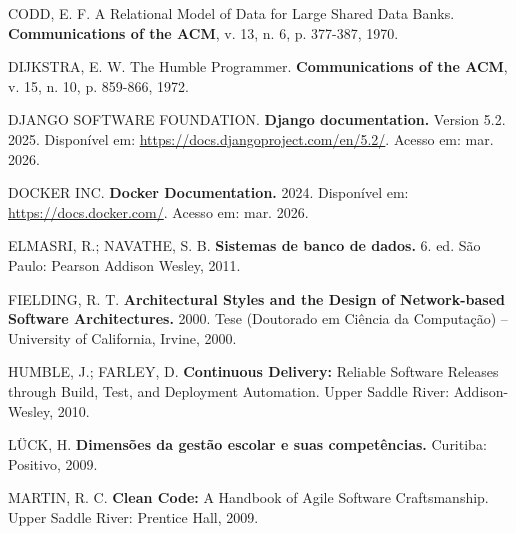 
\begin{singlespace}
\setlength{\parindent}{0pt}
\setlength{\parskip}{0pt}

CODD, E. F. A Relational Model of Data for Large Shared Data Banks. \textbf{Communications of the ACM}, v. 13, n. 6, p. 377-387, 1970.

\vspace{\baselineskip}

DIJKSTRA, E. W. The Humble Programmer. \textbf{Communications of the ACM}, v. 15, n. 10, p. 859-866, 1972.

\vspace{\baselineskip}

DJANGO SOFTWARE FOUNDATION. \textbf{Django documentation.} Version 5.2. 2025. Disponível em: \url{https://docs.djangoproject.com/en/5.2/}. Acesso em: mar. 2026.

\vspace{\baselineskip}

DOCKER INC. \textbf{Docker Documentation.} 2024. Disponível em: \url{https://docs.docker.com/}. Acesso em: mar. 2026.

\vspace{\baselineskip}

ELMASRI, R.; NAVATHE, S. B. \textbf{Sistemas de banco de dados.} 6. ed. São Paulo: Pearson Addison Wesley, 2011.

\vspace{\baselineskip}

FIELDING, R. T. \textbf{Architectural Styles and the Design of Network-based Software Architectures.} 2000. Tese (Doutorado em Ciência da Computação) -- University of California, Irvine, 2000.

\vspace{\baselineskip}

HUMBLE, J.; FARLEY, D. \textbf{Continuous Delivery:} Reliable Software Releases through Build, Test, and Deployment Automation. Upper Saddle River: Addison-Wesley, 2010.

\vspace{\baselineskip}

LÜCK, H. \textbf{Dimensões da gestão escolar e suas competências.} Curitiba: Positivo, 2009.

\vspace{\baselineskip}

MARTIN, R. C. \textbf{Clean Code:} A Handbook of Agile Software Craftsmanship. Upper Saddle River: Prentice Hall, 2009.


\end{singlespace}
